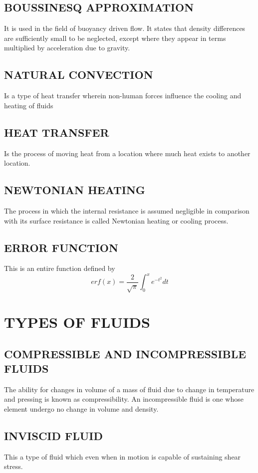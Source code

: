 \documentclass[11pt]{report}
\begin{document}
	\subsection{BOUSSINESQ APPROXIMATION}
	It is used in the field of buoyancy driven flow. It states that density differences are sufficiently small to be neglected, except where they appear in terms multiplied by acceleration due to gravity.
	
	\subsection{NATURAL CONVECTION}
	Is a type of heat transfer wherein non-human forces influence the cooling and heating of fluids
	
	\subsection{HEAT TRANSFER}
	Is the process of moving heat from a location where much heat exists to another location.
	
	\subsection{NEWTONIAN HEATING}
	The process in which the internal resistance is assumed negligible in comparison with its surface resistance is called Newtonian heating or cooling process.
	
	\subsection{ERROR FUNCTION}
	This is an entire function defined by
	\begin{equation*}
		er f(x) = \frac{2}{\sqrt{\pi}}\int_0^x e^{-t^2}dt
	\end{equation*}
	
	
	\section{TYPES OF FLUIDS}
	\subsection{COMPRESSIBLE AND INCOMPRESSIBLE FLUIDS}
	The ability for changes in volume of a mass of fluid due to change in temperature and pressing is known as compressibility. An incompressible fluid is one whose element undergo no change in volume and density.
	
	\subsection{INVISCID FLUID}
	This a type of fluid which even when in motion is capable of sustaining shear stress.
	
\end{document}
